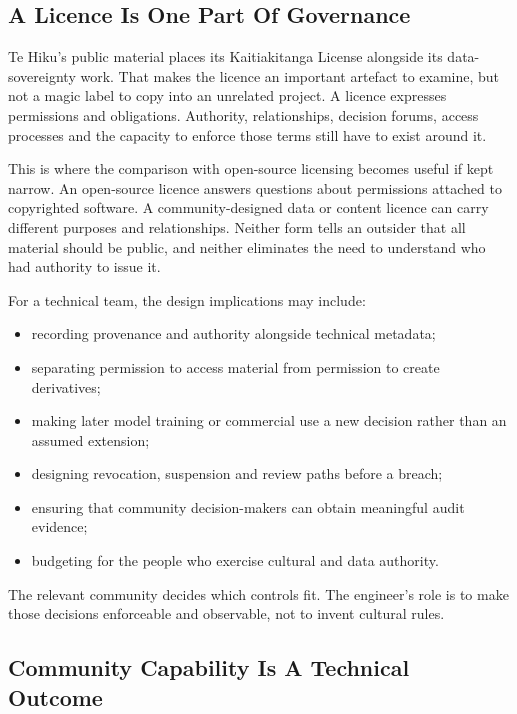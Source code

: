\subsection{A Licence Is One Part Of Governance}


Te Hiku's public material places its Kaitiakitanga License alongside its data-sovereignty work. That makes the licence an important artefact to examine, but not a magic label to copy into an unrelated project. A licence expresses permissions and obligations. Authority, relationships, decision forums, access processes and the capacity to enforce those terms still have to exist around it. \autocite{te-hiku-kaitiakitanga}


This is where the comparison with open-source licensing becomes useful if kept narrow. An open-source licence answers questions about permissions attached to copyrighted software. A community-designed data or content licence can carry different purposes and relationships. Neither form tells an outsider that all material should be public, and neither eliminates the need to understand who had authority to issue it.


For a technical team, the design implications may include:


\begin{itemize}[leftmargin=*]
\item recording provenance and authority alongside technical metadata;
\item separating permission to access material from permission to create derivatives;
\item making later model training or commercial use a new decision rather than an assumed extension;
\item designing revocation, suspension and review paths before a breach;
\item ensuring that community decision-makers can obtain meaningful audit evidence;
\item budgeting for the people who exercise cultural and data authority.
\end{itemize}

The relevant community decides which controls fit. The engineer's role is to make those decisions enforceable and observable, not to invent cultural rules.



\subsection{Community Capability Is A Technical Outcome}


